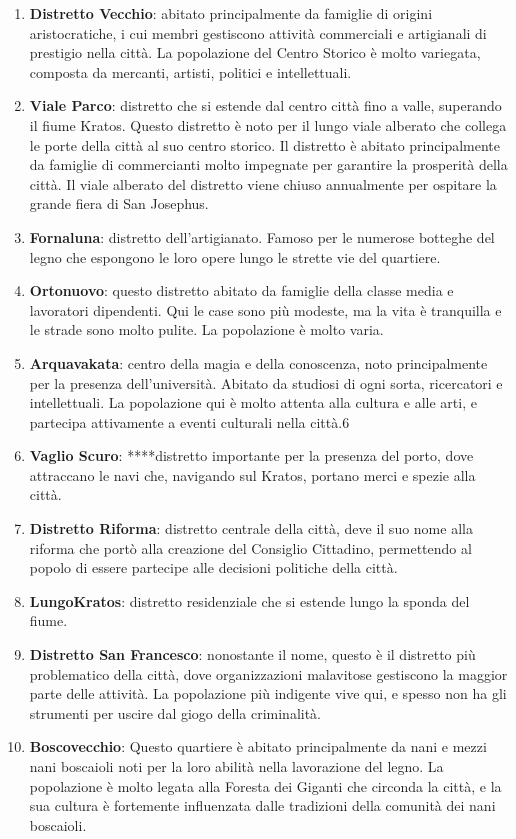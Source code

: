 \begin{enumerate}
\def\labelenumi{\arabic{enumi}.}
\tightlist
\item
  \textbf{Distretto Vecchio}: abitato principalmente da famiglie di
  origini aristocratiche, i cui membri gestiscono attività commerciali e
  artigianali di prestigio nella città. La popolazione del Centro
  Storico è molto variegata, composta da mercanti, artisti, politici e
  intellettuali.
\item
  \textbf{Viale Parco}: distretto che si estende dal centro città fino a
  valle, superando il fiume Kratos. Questo distretto è noto per il lungo
  viale alberato che collega le porte della città al suo centro storico.
  Il distretto è abitato principalmente da famiglie di commercianti
  molto impegnate per garantire la prosperità della città. Il viale
  alberato del distretto viene chiuso annualmente per ospitare la grande
  fiera di San Josephus.
\item
  \textbf{Fornaluna}: distretto dell'artigianato. Famoso per le numerose
  botteghe del legno che espongono le loro opere lungo le strette vie
  del quartiere.
\item
  \textbf{Ortonuovo}: questo distretto abitato da famiglie della classe
  media e lavoratori dipendenti. Qui le case sono più modeste, ma la
  vita è tranquilla e le strade sono molto pulite. La popolazione è
  molto varia.
\item
  \textbf{Arquavakata}: centro della magia e della conoscenza, noto
  principalmente per la presenza dell'università. Abitato da studiosi di
  ogni sorta, ricercatori e intellettuali. La popolazione qui è molto
  attenta alla cultura e alle arti, e partecipa attivamente a eventi
  culturali nella città.6
\item
  \textbf{Vaglio Scuro}: ****distretto importante per la presenza del
  porto, dove attraccano le navi che, navigando sul Kratos, portano
  merci e spezie alla città.
\item
  \textbf{Distretto Riforma}: distretto centrale della città, deve il
  suo nome alla riforma che portò alla creazione del Consiglio
  Cittadino, permettendo al popolo di essere partecipe alle decisioni
  politiche della città.
\item
  \textbf{LungoKratos}: distretto residenziale che si estende lungo la
  sponda del fiume.
\item
  \textbf{Distretto San Francesco}: nonostante il nome, questo è il
  distretto più problematico della città, dove organizzazioni malavitose
  gestiscono la maggior parte delle attività. La popolazione più
  indigente vive qui, e spesso non ha gli strumenti per uscire dal giogo
  della criminalità.
\item
  \textbf{Boscovecchio}: Questo quartiere è abitato principalmente da
  nani e mezzi nani boscaioli noti per la loro abilità nella lavorazione
  del legno. La popolazione è molto legata alla Foresta dei Giganti che
  circonda la città, e la sua cultura è fortemente influenzata dalle
  tradizioni della comunità dei nani boscaioli.
\end{enumerate}

